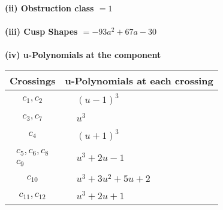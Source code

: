 \documentclass[1p]{elsarticle_modified}
\theoremstyle{definition}
\begin{document}
\flushleft \textbf{(ii) Obstruction class $= 1$}\\~\\
\flushleft \textbf{(iii) Cusp Shapes $= -93 a^2+67 a-30$}\\~\\
\newpage\renewcommand{\arraystretch}{1}
\flushleft \textbf{(iv) u-Polynomials at the component}\newline \\
\begin{tabular}{m{50pt}|m{274pt}}
Crossings & \hspace{64pt}u-Polynomials at each crossing \\
\hline $$\begin{aligned}c_{1},c_{2}\end{aligned}$$&$\begin{aligned}
&(u-1)^3
\end{aligned}$\\
\hline $$\begin{aligned}c_{3},c_{7}\end{aligned}$$&$\begin{aligned}
&u^3
\end{aligned}$\\
\hline $$\begin{aligned}c_{4}\end{aligned}$$&$\begin{aligned}
&(u+1)^3
\end{aligned}$\\
\hline $$\begin{aligned}c_{5},c_{6},c_{8}\\c_{9}\end{aligned}$$&$\begin{aligned}
&u^3+2 u-1
\end{aligned}$\\
\hline $$\begin{aligned}c_{10}\end{aligned}$$&$\begin{aligned}
&u^3+3 u^2+5 u+2
\end{aligned}$\\
\hline $$\begin{aligned}c_{11},c_{12}\end{aligned}$$&$\begin{aligned}
&u^3+2 u+1
\end{aligned}$\\
\hline
\end{tabular}\\~\\
\end{document}
